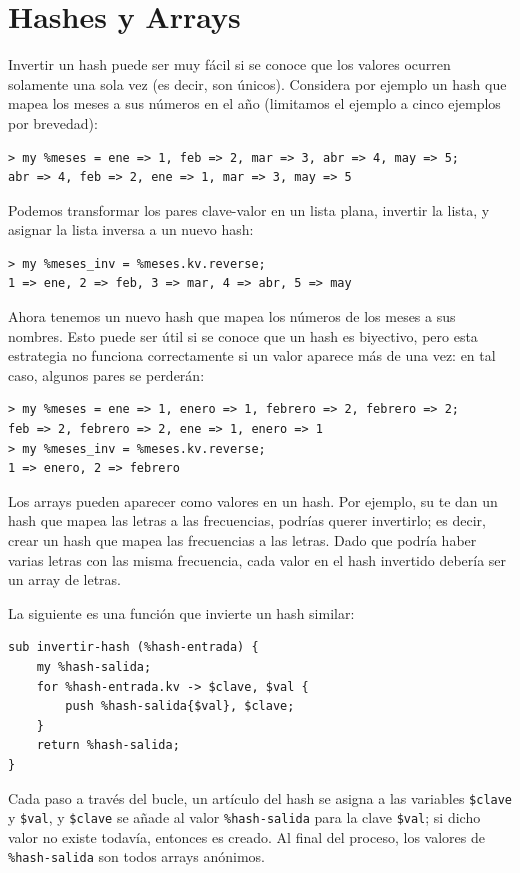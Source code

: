 \section{Hashes y Arrays}
\label{invert}

Invertir un hash puede ser muy fácil si se conoce que los valores 
ocurren solamente una sola vez (es decir, son únicos). Considera por ejemplo
un hash que mapea los meses a sus números en el año
(limitamos el ejemplo a cinco ejemplos por brevedad):

\begin{lstlisting}
> my %meses = ene => 1, feb => 2, mar => 3, abr => 4, may => 5;
abr => 4, feb => 2, ene => 1, mar => 3, may => 5
\end{lstlisting}
%

Podemos transformar los pares clave-valor en un lista plana,
invertir la lista, y asignar la lista inversa a un nuevo hash:

\begin{lstlisting}
> my %meses_inv = %meses.kv.reverse;
1 => ene, 2 => feb, 3 => mar, 4 => abr, 5 => may
\end{lstlisting}
%

Ahora tenemos un nuevo hash que mapea los números de los meses
a sus nombres. Esto puede ser útil si se conoce que un hash es biyectivo,
pero esta estrategia no funciona correctamente si un valor aparece más de una
vez: en tal caso, algunos pares se perderán:

\begin{lstlisting}
> my %meses = ene => 1, enero => 1, febrero => 2, febrero => 2;
feb => 2, febrero => 2, ene => 1, enero => 1
> my %meses_inv = %meses.kv.reverse;
1 => enero, 2 => febrero
\end{lstlisting}

Los arrays pueden aparecer como valores en un hash. Por ejemplo,
su te dan un hash que mapea las letras a las frecuencias, podrías querer
invertirlo; es decir, crear un hash que mapea las frecuencias  a las
letras. Dado que podría haber varias letras con las misma frecuencia, cada
valor en el hash invertido debería ser un array de letras.

La siguiente es una función que invierte un hash similar:

\begin{lstlisting}
sub invertir-hash (%hash-entrada) { 
    my %hash-salida; 
    for %hash-entrada.kv -> $clave, $val {
        push %hash-salida{$val}, $clave; 
    }
    return %hash-salida;
}
\end{lstlisting}
%
Cada paso a través del bucle, un artículo del hash se asigna a las variables
\verb|$clave| y  \verb|$val|, y \verb|$clave| se añade al valor \verb|%hash-salida|
para la clave \verb|$val|; si dicho valor no existe todavía, entonces es creado.
Al final del proceso, los valores de \verb|%hash-salida| son todos arrays anónimos.

